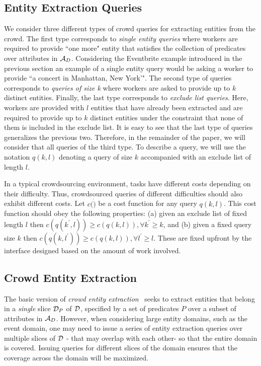\subsection{Entity Extraction Queries}
\label{sec:queries}
 We consider three different types of crowd queries for extracting entities from the crowd. The first type corresponds to {\em single entity queries} where workers are required to provide ``one more" entity that satisfies the collection of predicates over attributes in $\mathcal{A}_D$. Considering the Eventbrite example introduced in the previous section an example of a single entity query would be asking a worker to provide ``a concert in Manhattan, New York'". The second type of queries corresponds to {\em queries of  size k} where workers are asked to provide up to $k$ distinct entities. Finally, the last type corresponds to {\em exclude list queries}. Here,  workers are provided with $l$ entities that have already been extracted and are required to provide up to $k$ distinct entities under the constraint that none of them is included in the exclude list. It is easy to see that the last type of queries generalizes the previous two. Therefore, in the remainder of the paper, we will consider that all queries of the third type. To describe a query, we will use the notation $q(k,l)$ denoting a query of size $k$ accompanied with an exclude list of length $l$. 

In a typical crowdsourcing environment, tasks have different costs depending on their difficulty. Thus, crowdsourced queries of different difficulties should also exhibit different costs. Let $c(\dot)$ be a cost function for any query $q(k,l)$. This cost function should obey the following properties: (a) given an exclude list of fixed length $l$ then $c(q(k^{\prime},l)) \geq c(q(k,l)),  \forall k^{\prime} \geq k$, and (b) given a fixed query size $k$ then $c(q(k,l^{\prime})) \geq c(q(k,l)), \forall l^{\prime} \geq l$. These are fixed upfront by the interface designed based on the amount of work involved.

\subsection{Crowd Entity Extraction}
\label{sec:extraction}


The basic version of {\em crowd entity extraction}~\cite{trushkowsky:2013} seeks to extract entities that belong in a {\em single} slice $\mathcal{D}_P$ of $\mathcal{D}$, specified by a set of predicates $P$ over a subset of attributes in $\mathcal{A}_D$. However, when considering large entity domains, such as the event domain, one may need to issue a series of entity extraction queries over multiple slices of $\mathcal{D}$ - that may overlap with each other- so that the entire domain is covered. Issuing queries for different slices of the domain ensures that the coverage across the domain will be maximized. 

